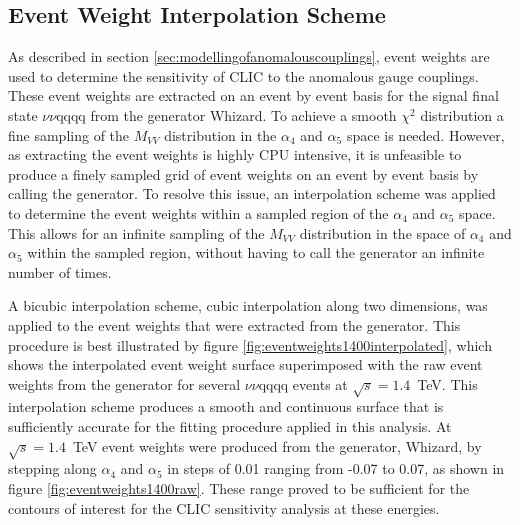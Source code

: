 
\subsection{Event Weight Interpolation Scheme}
\label{sec:eventweightsinterpolation}
As described in section \ref{sec:modellingofanomalouscouplings}, event weights are used to determine the sensitivity of CLIC to the anomalous gauge couplings.  These event weights are extracted on an event by event basis for the signal final state $\nu\nu\text{qqqq}$ from the generator Whizard.  To achieve a smooth $\chi^{2}$ distribution a fine sampling of the $M_{VV}$ distribution in the $\alpha_{4}$ and $\alpha_{5}$ space is needed.  However, as extracting the event weights is highly CPU intensive, it is unfeasible to produce a finely sampled grid of event weights on an event by event basis by calling the generator.  To resolve this issue, an interpolation scheme was applied to determine the event weights within a sampled region of the $\alpha_{4}$ and $\alpha_{5}$ space.  This allows for an infinite sampling of the $M_{VV}$ distribution in the space of $\alpha_{4}$ and $\alpha_{5}$ within the sampled region, without having to call the generator an infinite number of times.

A bicubic interpolation scheme, cubic interpolation along two dimensions, was applied to the event weights that were extracted from the generator.  This procedure is best illustrated by figure \ref{fig:eventweights1400interpolated}, which shows the interpolated event weight surface superimposed with the raw event weights from the generator for several $\nu\nu\text{qqqq}$ events at $\sqrt{s}=1.4$~TeV.  This interpolation scheme produces a smooth and continuous surface that is sufficiently accurate for the fitting procedure applied in this analysis.  At $\sqrt{s}=1.4$~TeV event weights were produced from the generator, Whizard, by stepping along $\alpha_{4}$ and $\alpha_{5}$ in steps of 0.01 ranging from -0.07 to 0.07, as shown in figure \ref{fig:eventweights1400raw}.  These range proved to be sufficient for the contours of interest for the CLIC sensitivity analysis at these energies.

